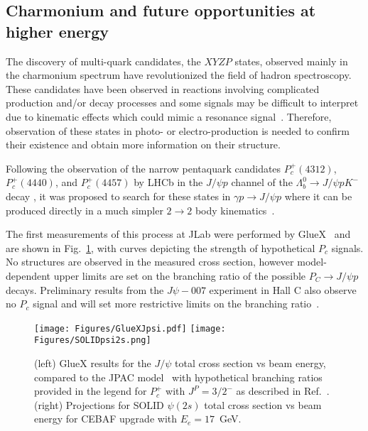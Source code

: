 \subsection{Charmonium and future opportunities at higher energy} 
\label{sec:CharmPentaquark}

The discovery of multi-quark candidates, the $XYZP$ states, observed mainly in the charmonium spectrum have revolutionized the field of hadron spectroscopy. These candidates have been observed in reactions involving complicated production and/or decay processes and some signals may be difficult to interpret due to kinematic effects which could mimic a resonance signal~\cite{Esposito:2016noz,Guo:2017jvc,Olsen:2017bmm,Brambilla:2019esw}.  Therefore, observation of these states in photo- or electro-production is needed to confirm their   existence and obtain more information on their structure.

Following the observation of the narrow pentaquark candidates $P_c^+(4312)$, $P_c^+(4440)$, and $P_c^+(4457)$ by LHCb in the $J/\psi p$ channel of the $\Lambda^0_b \rightarrow J/\psi pK^-$ decay \cite{LHCb:2015yax,LHCb:2019kea}, it was proposed to search for these states in $\gamma p \to J/\psi p$ where it can be produced directly in a much simpler $2 \to 2$ body kinematics~\cite{Wang:2015jsa,Kubarovsky:2015aaa,Karliner:2015voa,HillerBlin:2016odx}.
  
  
The first measurements of this process at JLab were performed by GlueX~\cite{Ali:2019lzf} and are shown in Fig.~\ref{fig:ccbar-xsec}, with curves depicting the strength of hypothetical $P_c$ signals.  No structures are observed in the measured cross section, however model-dependent upper limits are set on the branching ratio of the possible $P_C \rightarrow J/\psi p$ decays.  Preliminary results from the $J\psi-007$ experiment in Hall C also observe no $P_c$ signal and will set more restrictive limits on the branching ratio~\cite{ghpJpsi007}.

\begin{figure}[ht]
\begin{center}
    \texttt{[image: Figures/GlueXJpsi.pdf]}
    \texttt{[image: Figures/SOLIDpsi2s.png]}
    \caption{(left) GlueX results for the $J/\psi $ total cross section vs beam energy, compared to the JPAC model~\cite{HillerBlin:2016odx} with hypothetical branching ratios provided in the legend for $P_c^+$ with $J^P=3/2^-$ as described in Ref.~\cite{Ali:2019lzf}.  (right) Projections for SOLID $\psi(2s)$ total cross section vs beam energy for CEBAF upgrade with $E_e = 17$~GeV.
}
\label{fig:ccbar-xsec}
\end{center}
\end{figure}
   
